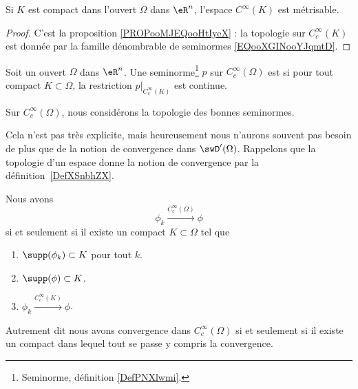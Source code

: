 \begin{lemma}		\label{LEMooFKWMooSoqITJ}
	Si \( K\) est compact dans l'ouvert \( \Omega\) dans \( \eR^n\), l'espace \( C^{\infty}(K)\) est métrisable.
\end{lemma}

\begin{proof}
	C'est la proposition \ref{PROPooMJEQooHtIyeX} : la topologie sur \( C^{\infty}_c(K)\) est donnée par la famille dénombrable de seminormes \eqref{EQooXGINooYJqmtD}.
\end{proof}


\begin{definition}		\label{DEFooVSCRooLyYBzT}
	Soit un ouvert \( \Omega\) dans \( \eR^n\). Une seminorme\footnote{Seminorme, définition \ref{DefPNXlwmi}.} \( p\) sur \( C^{\infty}_c(\Omega)\) est  si pour tout compact \( K\subset \Omega\), la restriction \( p|_{C^{\infty}_c(K)}\) est continue.

	Sur \( C^{\infty}_c(\Omega)\), nous considérons la topologie des bonnes seminormes.
\end{definition}

Cela n'est pas très explicite, mais heureusement nous n'aurons souvent pas besoin de plus que de la notion de convergence dans \( \swD'(\Omega)\). Rappelons que la topologie d'un espace donne la notion de convergence par la définition~\ref{DefXSnbhZX}.


\begin{proposition}		\label{PROPooRAZSooDttIbK}
	Nous avons
	\begin{equation}
		\phi_k\stackrel{ C^{\infty}_c(\Omega)}{\longrightarrow} \phi
	\end{equation}
	si et seulement si il existe un compact \( K\subset \Omega\) tel que
	\begin{enumerate}
		\item
		      \( \supp(\phi_k)\subset K\) pour tout \( k\).
		\item
		      \( \supp(\phi)\subset K\).
		\item
		      \( \phi_k\stackrel{ C^{\infty}_c(K)}{\longrightarrow} \phi\).
	\end{enumerate}
	Autrement dit nous avons convergence dans \( C^{\infty}_c(\Omega)\) si et seulement si il existe un compact dans lequel tout se passe y compris la convergence.
\end{proposition}

